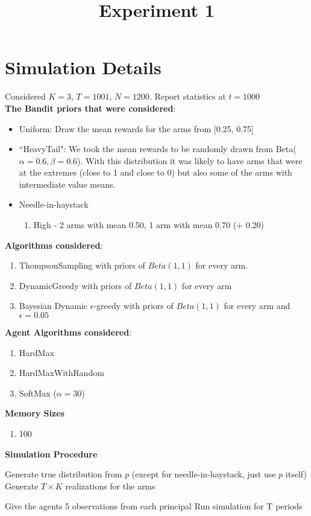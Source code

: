 \documentclass[11pt,letterpaper]{article}
\begin{document}
 

\title{Experiment 1}
\maketitle

\section*{Simulation Details}

Considered $K = 3$, $T = 1001$, $N = 1200$. Report statistics at $t = 1000$ \\
\textbf{The Bandit priors that were considered}:
\begin{itemize}
\item Uniform: Draw the mean rewards for the arms from [0.25, 0.75]
\item ``HeavyTail": We took the mean rewards to be randomly drawn from Beta($\alpha=0.6,\beta=0.6$). With this distribution it was likely to have arms that were at the extremes (close to 1 and close to 0) but also some of the arms with intermediate value means.
\item Needle-in-haystack
\begin{enumerate}
\item High - 2 arms with mean 0.50, 1 arm with mean 0.70 (+ 0.20)
\end{enumerate}
\end{itemize}
\textbf{Algorithms considered}:
\begin{enumerate}
\item ThompsonSampling with priors of $Beta(1, 1)$ for every arm.
\item DynamicGreedy with priors of $Beta(1, 1)$ for every arm
\item Bayesian Dynamic $\epsilon$-greedy with priors of $Beta(1, 1)$ for every arm and $\epsilon=0.05$
\end{enumerate}
\textbf{Agent Algorithms considered}:
\begin{enumerate}
\item HardMax
\item HardMaxWithRandom
\item SoftMax ($\alpha = 30$)
\end{enumerate}
\textbf{Memory Sizes}
\begin{enumerate}
\item 100
\end{enumerate}
\pagebreak
\textbf{Simulation Procedure}
\begin{algorithm}
\begin{algorithmic}[1]
\State Generate true distribution from $p$ (except for needle-in-haystack, just use $p$ itself)
\State Generate $T \times K$ realizations for the arms 
				
				\State Give the agents 5 observations from each principal
				\State Run simulation for T periods
			\EndFor
		\EndFor
	\EndFor
\EndFor
\end{algorithmic}
\end{algorithm}
\end{document}
